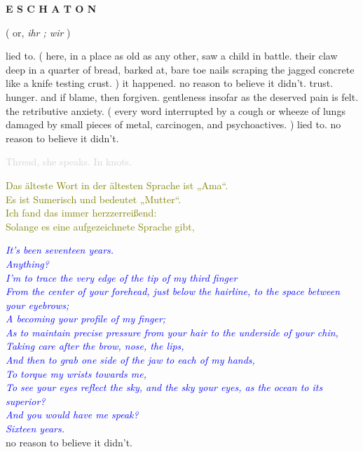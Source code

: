 \documentclass[11pt]{article}
\begin{document}
\begingroup
\begin{center}
\huge \textbf{E S C H A T O N}
\end{center}
\endgroup

\begingroup
\begin{center}
( or, \textit{ihr ; wir} )
\end{center}
\endgroup

\vspace*{2\baselineskip}

\begingroup
lied to. ( here, in a place as old as any other, saw a child in battle. their claw deep in a quarter of bread, barked at, bare toe nails scraping the jagged concrete like a knife testing crust. ) it happened. no reason to believe it didn't. trust. hunger. and if blame, then forgiven. gentleness insofar as the deserved pain is felt. the retributive anxiety. ( every word interrupted by a cough or wheeze of lungs damaged by small pieces of metal, carcinogen, and psychoactives. ) lied to. no reason to believe it didn't.
\endgroup

\begingroup
\begin{center}
\textcolor{lightgray}{Thread, she speaks. In knots.}
\rightskip\leftskip
\end{center}
\endgroup

\begingroup
\begin{center}
\textcolor{olive}{Das älteste Wort in der ältesten Sprache ist „Ama“. \\ Es ist Sumerisch und bedeutet „Mutter“. \\ Ich fand das immer herzzerreißend: \\ Solange es eine aufgezeichnete Sprache gibt,}
\end{center}
\endgroup

\begingroup
\begin{center}
\textit{\textcolor{blue}{It's been seventeen years. \\ Anything? \\ I'm to trace the very edge of the tip of my third finger \\ From the center of your forehead, just below the hairline, to the space between your eyebrows; \\ A becoming your profile of my finger; \\ As to maintain precise pressure from your hair to the underside of your chin, \\ Taking care after the brow, nose, the lips, \\ And then to grab one side of the jaw to each of my hands, \\ To torque my wrists towards me, \\ To see your eyes reflect the sky, and the sky your eyes, as the ocean to its superior? \\ And you would have me speak? \\ Sixteen years. } } \\ no reason to believe it didn't. 
\end{center}
\endgroup
\end{document}
